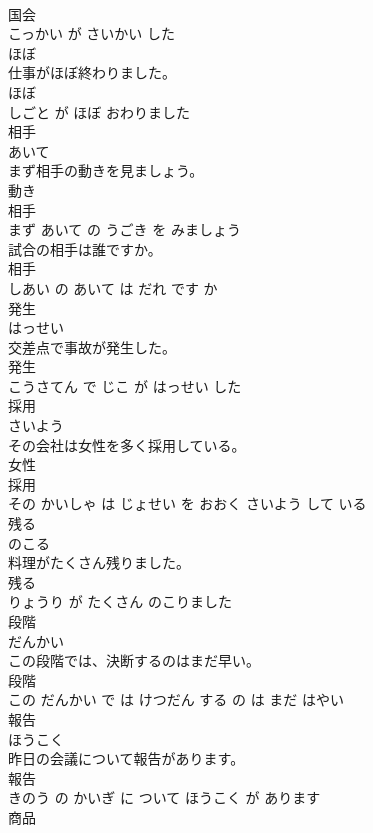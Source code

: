 \documentclass[8pt]{extreport}
\begin{document}
\begin{CJK}{UTF8}{min}
\\	国会 
\\	こっかい が さいかい した			
\\	ほぼ	
\\	仕事がほぼ終わりました。	
\\	ほぼ 
\\	しごと が ほぼ おわりました			
\\	相手	
\\	あいて			
\\	まず相手の動きを見ましょう。	
\\	動き 
\\	相手 
\\	まず あいて の うごき を みましょう			
\\	試合の相手は誰ですか。	
\\	相手 
\\	しあい の あいて は だれ です か			
\\	発生	
\\	はっせい			
\\	交差点で事故が発生した。	
\\	発生 
\\	こうさてん で じこ が はっせい した			
\\	採用	
\\	さいよう			
\\	その会社は女性を多く採用している。	
\\	女性 
\\	採用 
\\	その かいしゃ は じょせい を おおく さいよう して いる			
\\	残る	
\\	のこる			
\\	料理がたくさん残りました。	
\\	残る 
\\	りょうり が たくさん のこりました			
\\	段階	
\\	だんかい			
\\	この段階では、決断するのはまだ早い。	
\\	段階 
\\	この だんかい で は けつだん する の は まだ はやい			
\\	報告	
\\	ほうこく			
\\	昨日の会議について報告があります。	
\\	報告 
\\	きのう の かいぎ に ついて ほうこく が あります			
\\	商品	

\end{CJK}
\end{document}

